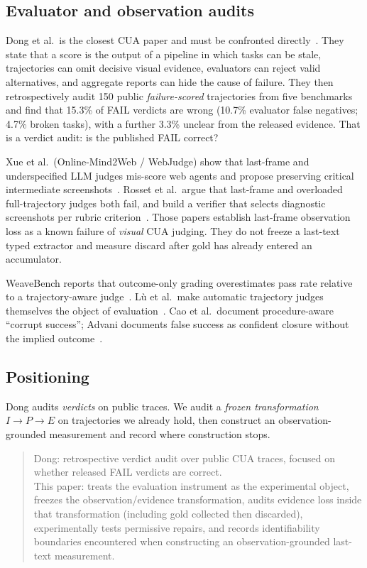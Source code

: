 \documentclass[sigconf,anonymous]{aamas}
\begin{document}
\subsection{Evaluator and observation audits}
\label{sec:rw-audit}

Dong et al.\ is the closest CUA paper and must be confronted directly~\citep{dong2026misscore}.
They state that a score is the output of a pipeline in which tasks can be stale, trajectories can omit decisive visual evidence, evaluators can reject valid alternatives, and aggregate reports can hide the cause of failure.
They then retrospectively audit 150 public \emph{failure-scored} trajectories from five benchmarks and find that 15.3\% of FAIL verdicts are wrong (10.7\% evaluator false negatives; 4.7\% broken tasks), with a further 3.3\% unclear from the released evidence.
That is a verdict audit: is the published FAIL correct?

Xue et al.\ (Online-Mind2Web / WebJudge) show that last-frame and underspecified LLM judges mis-score web agents and propose preserving critical intermediate screenshots~\citep{xue2025illusion}.
Rosset et al.\ argue that last-frame and overloaded full-trajectory judges both fail, and build a verifier that selects diagnostic screenshots per rubric criterion~\citep{rosset2026verifiers}.
Those papers establish last-frame observation loss as a known failure of \emph{visual} CUA judging.
They do not freeze a last-text typed extractor and measure discard after gold has already entered an accumulator.

WeaveBench reports that outcome-only grading overestimates pass rate relative to a trajectory-aware judge~\citep{li2026weavebench}.
L\`u et al.\ make automatic trajectory judges themselves the object of evaluation~\citep{lu2025agentrewardbench}.
Cao et al.\ document procedure-aware ``corrupt success''; Advani documents false success as confident closure without the implied outcome~\citep{cao2026corruptsuccess,advani2026falsesuccess}.

\subsection{Positioning}
\label{sec:rw-pos}

Dong audits \emph{verdicts} on public traces.
We audit a \emph{frozen transformation} $I\to P\to E$ on trajectories we already hold, then construct an observation-grounded measurement and record where construction stops.

\begin{quote}
Dong: retrospective verdict audit over public CUA traces, focused on whether released FAIL verdicts are correct.\\[4pt]
This paper: treats the evaluation instrument as the experimental object, freezes the observation/evidence transformation, audits evidence loss inside that transformation (including gold collected then discarded), experimentally tests permissive repairs, and records identifiability boundaries encountered when constructing an observation-grounded last-text measurement.
\end{quote}
\end{document}
